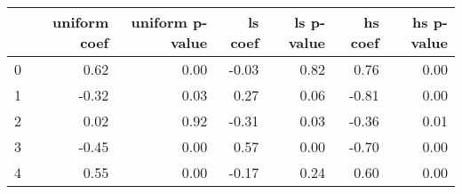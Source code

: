 \begin{tabular}{lrrrrrr}
\toprule
 & uniform coef & uniform p-value & ls coef & ls p-value & hs coef & hs p-value \\
\midrule
0 & 0.62 & 0.00 & -0.03 & 0.82 & 0.76 & 0.00 \\
1 & -0.32 & 0.03 & 0.27 & 0.06 & -0.81 & 0.00 \\
2 & 0.02 & 0.92 & -0.31 & 0.03 & -0.36 & 0.01 \\
3 & -0.45 & 0.00 & 0.57 & 0.00 & -0.70 & 0.00 \\
4 & 0.55 & 0.00 & -0.17 & 0.24 & 0.60 & 0.00 \\
\bottomrule
\end{tabular}
